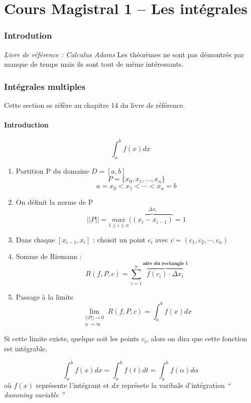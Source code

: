 \part{Cours Magistral 1 -- Les intégrales}
\section{Introdution}
\emph{Livre de référence : Calculus Adams}
Les théorèmes ne sont pas démontrés par manque de temps mais ils sont tout de même intéressants.
\section{Intégrales multiples}

Cette section se réfère au chapitre 14 du livre de référence.
\subsection{Introduction}
\[\int_{a}^{b} {f(x) dx}\]


\begin{enumerate}

\item Partition P du domaine $D=[a,b]$
$$ P = \{x_0,x_1,...,x_n\}$$
$$a=x_0<x_1<\cdots<x_n=b$$
\item On définit la norme de P
$$||P|| = \underset{1\le i \le n}{max}(\overbrace{(x_i-x_{i-1})}^{\Delta x_i}=1$$

\item Dans chaque $[{x_{i-1},x_i}]$ : choisit un point $c_i$ avec $c=(c_1,c_2,\cdots,c_n)$

\item  Somme de Riemann : $$R(f,P,c)=\sum_{i=1}^{n} \overbrace{f(c_i)\cdot \Delta  x_i}^{\textbf{aire du rectangle i}} $$

\item Passage à la limite $$\lim\limits_{\substack{||P|| \to 0 \\ n \to \infty}} R(f,P,c) =\int_{a}^{b} {f(x) dx}$$

\end{enumerate}
Si cette limite existe, quelque soit les points $c_i$, alors on dira que cette fonction est intégrable.
\begin{myrem}
$$\int_{a}^{b} {f(x) dx} = \int_{a}^{b} {f(t) dt} = \int_{a}^{b} {f(\alpha) d\alpha}$$ où $f(x)$ représente l'intégrant et $dx$ représete la varibale d'intégration \textit{`` dumming variable ''}
\end{myrem}

